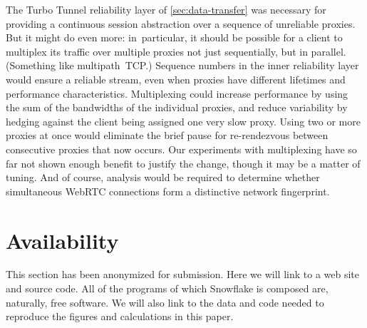 \documentclass[letterpaper,twocolumn]{article}
\begin{document}
The Turbo Tunnel reliability layer of \autoref{sec:data-transfer}
was necessary for providing a continuous session abstraction
over a sequence of unreliable proxies.
But it might do even more:
in~particular, it should be possible
for a client to multiplex its traffic
over multiple proxies not just sequentially, but in parallel.
(Something like multipath~TCP.)
Sequence numbers in the inner reliability layer
would ensure a reliable stream, even when proxies
have different lifetimes and performance characteristics.
Multiplexing could increase performance by using the sum
of the bandwidths of the individual proxies,
and reduce variability by hedging against the
client being assigned one very slow proxy.
Using two or more proxies at once would
eliminate the brief pause for re-rendezvous
between consecutive proxies that now occurs.
Our experiments with multiplexing have so far
not shown enough benefit to justify the change,
though it may be a matter of tuning.
And of course, analysis would be required
to determine whether simultaneous WebRTC connections
form a distinctive network fingerprint.

\section*{Availability}

This section has been anonymized for submission.
Here we will link to a web site and source code.
All of the programs of which Snowflake is composed are,
naturally, free software.
We will also link to the data and code needed to reproduce
the figures and calculations in this paper.

{
\raggedright


}
\end{document}
